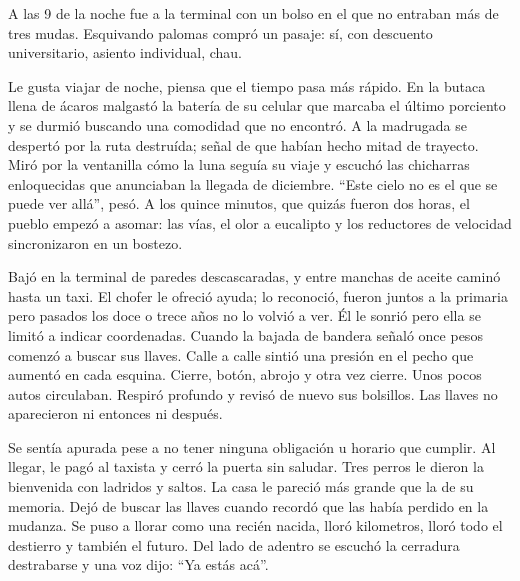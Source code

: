 
A las 9 de la noche fue a la terminal con un bolso en el que no entraban
más de tres mudas. Esquivando palomas compró un pasaje: sí, con 
descuento universitario, asiento individual, chau.

Le gusta viajar de noche, piensa que el tiempo pasa más rápido. En la
butaca llena de ácaros malgastó la batería de su celular que marcaba
el último porciento y se durmió buscando una comodidad que no encontró.
A la madrugada se despertó por la ruta destruída; señal de que habían
hecho mitad de trayecto. Miró por la ventanilla cómo la luna seguía su
viaje y escuchó las chicharras enloquecidas que anunciaban la llegada
de diciembre. ``Este cielo no es el que se puede ver allá'', pesó. A los
quince minutos, que quizás fueron dos horas, el pueblo empezó a asomar:
las vías, el olor a eucalipto y los reductores de velocidad sincronizaron
en un bostezo.

Bajó en la terminal de paredes descascaradas, y entre manchas de aceite
caminó hasta un taxi. El chofer le ofreció ayuda; lo reconoció, fueron
juntos a la primaria pero pasados los doce o trece años no lo volvió a
ver. Él le sonrió pero ella se limitó a indicar coordenadas. Cuando la
bajada de bandera señaló once pesos comenzó a buscar sus llaves. Calle
a calle sintió una presión en el pecho que aumentó en cada esquina.
Cierre, botón, abrojo y otra vez cierre. Unos pocos autos circulaban.
Respiró profundo y revisó de nuevo sus bolsillos. Las llaves no aparecieron
ni entonces ni después.

Se sentía apurada pese a no tener ninguna obligación
u horario que cumplir. Al llegar, le pagó al taxista y cerró la puerta sin
saludar. Tres perros le dieron la bienvenida con ladridos y saltos. La casa le
pareció más grande que la de su memoria. Dejó de buscar las llaves cuando
recordó que las había perdido en la mudanza. Se puso a llorar como una
recién nacida, lloró kilometros, lloró todo el destierro y también el
futuro. Del lado de adentro se escuchó la cerradura destrabarse y una voz
dijo: ``Ya estás acá''.
